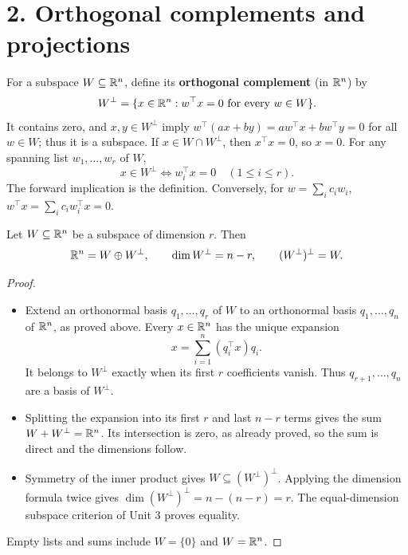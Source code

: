 \section*{2. Orthogonal complements and projections}

For a subspace \(W\subseteq\mathbb R^n\), define
its \textbf{orthogonal complement} (in \(\mathbb R^n\)) by
\[
W^\perp=\{x\in\mathbb R^n:w^\top x=0\text{ for every }w\in W\}.
\]
It contains zero, and \(x,y\in W^\perp\) imply
\(w^\top(ax+by)=a w^\top x+b w^\top y=0\) for all \(w\in W\);
thus it is a subspace. If \(x\in W\cap W^\perp\), then \(x^\top x=0\),
so \(x=0\).
For any spanning list \(w_1,\ldots,w_r\) of \(W\),
\[
x\in W^\perp\Longleftrightarrow w_i^\top x=0\quad(1\leqslant i\leqslant r).
\]
The forward implication is the definition. Conversely, for
\(w=\sum_i c_i w_i\), \(w^\top x=\sum_i c_i w_i^\top x=0\).

\begin{theorem}\label{thm:06:complement}
Let \(W\subseteq\mathbb R^n\) be a subspace of dimension \(r\). Then
\[
\mathbb R^n=W\oplus W^\perp,\qquad
\dim W^\perp=n-r,\qquad (W^\perp)^\perp=W.
\]
\end{theorem}
\begin{proof}
\begin{itemize}
\item Extend an orthonormal basis \(q_1,\ldots,q_r\) of \(W\) to an
  orthonormal basis \(q_1,\ldots,q_n\) of \(\mathbb R^n\), as proved above.
  Every \(x\in\mathbb R^n\) has the unique expansion
  \[
  x=\sum_{i=1}^n(q_i^\top x)q_i.
  \]
  It belongs to \(W^\perp\) exactly when its first \(r\) coefficients
  vanish. Thus \(q_{r+1},\ldots,q_n\) are a basis of \(W^\perp\).
\item Splitting the expansion into its first \(r\) and last \(n-r\)
  terms gives the sum \(W+W^\perp=\mathbb R^n\). Its intersection is zero,
  as already proved, so the sum is direct and the dimensions follow.
\item Symmetry of the inner product gives
  \(W\subseteq(W^\perp)^\perp\). Applying the dimension formula twice
  gives \(\dim(W^\perp)^\perp=n-(n-r)=r\). The equal-dimension
  subspace criterion of Unit 3 proves equality.
\end{itemize}
Empty lists and sums include \(W=\{0\}\) and \(W=\mathbb R^n\).
\end{proof}

